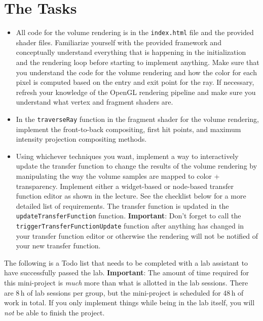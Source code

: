 \documentclass{labinstructions}
\begin{document}
\section{The Tasks}
\begin{itemize}
  \item All code for the volume rendering is in the \texttt{index.html} file and the provided shader files. Familiarize yourself with the provided framework and conceptually understand everything that is happening in the initialization and the rendering loop before starting to implement anything. Make sure that you understand the code for the volume rendering and how the color for each pixel is computed based on the entry and exit point for the ray. If necessary, refresh your knowledge of the OpenGL rendering pipeline and make sure you understand what vertex and fragment shaders are.
  \item In the \texttt{traverseRay} function in the fragment shader for the volume rendering, implement the front-to-back compositing, first hit points, and maximum intensity projection compositing methods.
  \item Using whichever techniques you want, implement a way to interactively update the transfer function to change the results of the volume rendering by manipulating the way the volume samples are mapped to color + transparency.  Implement either a widget-based or node-based transfer function editor as shown in the lecture.  See the checklist below for a more detailed list of requirements.  The transfer function is updated in the \texttt{updateTransferFunction} function.  \textbf{Important}:  Don't forget to call the \texttt{triggerTransferFunctionUpdate} function after anything has changed in your transfer function editor or otherwise the rendering will not be notified of your new transfer function.
\end{itemize}

The following is a Todo list that needs to be completed with a lab assistant to have successfully passed the lab.  \textbf{Important}:  The amount of time required for this mini-project is \emph{much} more than what is allotted in the lab sessions.  There are 8\,h of lab sessions per group, but the mini-project is scheduled for 48\,h of work in total.  If you only implement things while being in the lab itself, you will \emph{not} be able to finish the project.
\end{document}
